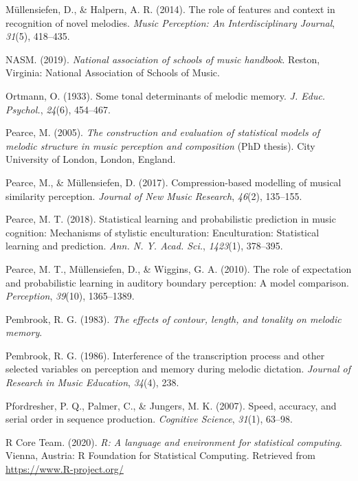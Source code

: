 \documentclass[english,man,floatsintext]{apa6}
\begin{document}
\leavevmode\hypertarget{ref-Mullensiefen2014-ta}{}%
Müllensiefen, D., \& Halpern, A. R. (2014). The role of features and context in recognition of novel melodies. \emph{Music Perception: An Interdisciplinary Journal}, \emph{31}(5), 418--435.

\leavevmode\hypertarget{ref-Nasm2019-fs}{}%
NASM. (2019). \emph{National association of schools of music handbook}. Reston, Virginia: National Association of Schools of Music.

\leavevmode\hypertarget{ref-Ortmann1933-ty}{}%
Ortmann, O. (1933). Some tonal determinants of melodic memory. \emph{J. Educ. Psychol.}, \emph{24}(6), 454--467.

\leavevmode\hypertarget{ref-Pearce2005-hb}{}%
Pearce, M. (2005). \emph{The construction and evaluation of statistical models of melodic structure in music perception and composition} (PhD thesis). City University of London, London, England.

\leavevmode\hypertarget{ref-Pearce2017-rr}{}%
Pearce, M., \& Müllensiefen, D. (2017). Compression-based modelling of musical similarity perception. \emph{Journal of New Music Research}, \emph{46}(2), 135--155.

\leavevmode\hypertarget{ref-Pearce2018-lb}{}%
Pearce, M. T. (2018). Statistical learning and probabilistic prediction in music cognition: Mechanisms of stylistic enculturation: Enculturation: Statistical learning and prediction. \emph{Ann. N. Y. Acad. Sci.}, \emph{1423}(1), 378--395.

\leavevmode\hypertarget{ref-Pearce2010-mw}{}%
Pearce, M. T., Müllensiefen, D., \& Wiggins, G. A. (2010). The role of expectation and probabilistic learning in auditory boundary perception: A model comparison. \emph{Perception}, \emph{39}(10), 1365--1389.

\leavevmode\hypertarget{ref-pembrook1983}{}%
Pembrook, R. G. (1983). \emph{The effects of contour, length, and tonality on melodic memory}.

\leavevmode\hypertarget{ref-Pembrook1986-cg}{}%
Pembrook, R. G. (1986). Interference of the transcription process and other selected variables on perception and memory during melodic dictation. \emph{Journal of Research in Music Education}, \emph{34}(4), 238.

\leavevmode\hypertarget{ref-pfordresher2007speed}{}%
Pfordresher, P. Q., Palmer, C., \& Jungers, M. K. (2007). Speed, accuracy, and serial order in sequence production. \emph{Cognitive Science}, \emph{31}(1), 63--98.

\leavevmode\hypertarget{ref-R-base}{}%
R Core Team. (2020). \emph{R: A language and environment for statistical computing}. Vienna, Austria: R Foundation for Statistical Computing. Retrieved from \url{https://www.R-project.org/}
\end{document}
